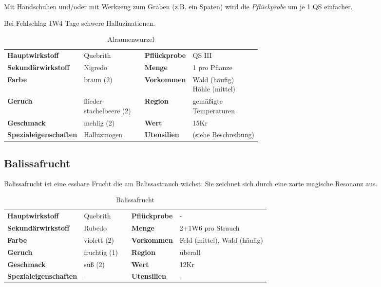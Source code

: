 Mit Handschuhen und/oder mit Werkzeug zum Graben (z.B. ein Spaten) wird die \textit{Pflückprobe} um je 1 QS einfacher.

Bei Fehlschlag 1W4 Tage schwere Halluzinationen.

\begin{table}[h] 
\begin{center} 
\begin{tabular}{|l|l|p{1cm}|l|l|} 
  	\cline{1-2} \cline{4-5} 
  	\textbf{Hauptwirkstoff} & Quebrith && \textbf{Pflückprobe} & QS III \\ \cline{1-2} \cline{4-5} 
  	\textbf{Sekundärwirkstoff} & Nigredo && \textbf{Menge} & 1 pro Pflanze \\ \cline{1-2} \cline{4-5} 
  	\textbf{Farbe} & braun (2) && \textbf{Vorkommen} & \brcell{Wald (häufig) \\ Höhle (mittel)} \\ \cline{1-2} \cline{4-5} 
  	\textbf{Geruch} & \brcell{flieder- \\ stachelbeere (2)} && \textbf{Region} & \brcell{gemäßigte \\ Temperaturen} \\ \cline{1-2} \cline{4-5} 
  	\textbf{Geschmack} & mehlig (2) && \textbf{Wert} & 15Kr \\ \cline{1-2} \cline{4-5} 
  	\textbf{Spezialeigenschaften} & Halluzinogen && \textbf{Utensilien} & (siehe Beschreibung) \\ \cline{1-2} \cline{4-5} 
\end{tabular} 
\end{center} 
\caption{Alraunenwurzel} 
\label{tab:alraunenwurzel} 
\end{table}


\subsection{Balissafrucht}
Balissafrucht ist eine essbare Frucht die am Balissastrauch wächst. Sie zeichnet sich durch eine zarte magische Resonanz aus. 
\newpage
\begin{table}[h]
\begin{center}
\begin{tabular}{|l|l|p{1cm}|l|l|}
	\cline{1-2} \cline{4-5}
	\textbf{Hauptwirkstoff} & Quebrith && \textbf{Pflückprobe} & - \\ \cline{1-2} \cline{4-5}
	\textbf{Sekundärwirkstoff} & Rubedo && \textbf{Menge} & 2+1W6 pro Strauch \\ \cline{1-2} \cline{4-5}
	\textbf{Farbe} & violett (2) && \textbf{Vorkommen} & Feld (mittel), Wald (häufig) \\ \cline{1-2} \cline{4-5}
	\textbf{Geruch} & fruchtig (1) && \textbf{Region} & überall \\ \cline{1-2} \cline{4-5}
	\textbf{Geschmack} & süß (2) && \textbf{Wert} & 12Kr \\ \cline{1-2} \cline{4-5}
	\textbf{Spezialeigenschaften} & - && \textbf{Utensilien} & - \\ \cline{1-2} \cline{4-5}
\end{tabular}
\end{center}
\caption{Balissafrucht}
\label{tab:balissafrucht}
\end{table}


